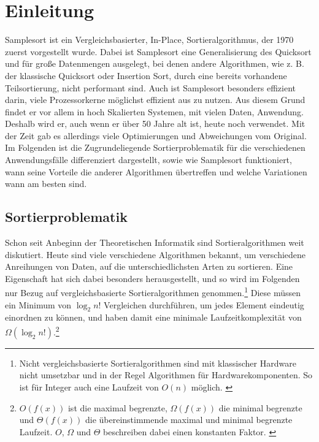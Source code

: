 \section{Einleitung}
	Samplesort ist ein Vergleichsbasierter, In-Place, Sortieralgorithmus, der 1970 zuerst vorgestellt wurde. \autocite{frazer-1970}
	Dabei ist Samplesort eine Generalisierung des Quicksort und für große Datenmengen ausgelegt, bei denen andere Algorithmen, wie z. B. der klassische Quicksort oder Insertion Sort, durch eine bereits vorhandene Teilsortierung, nicht performant sind.
	Auch ist Samplesort besonders effizient darin, viele Prozessorkerne möglichst effizient aus zu nutzen.
	Aus diesem Grund findet er vor allem in hoch Skalierten Systemen, mit vielen Daten, Anwendung.\\
	Deshalb wird er, auch wenn er über 50 Jahre alt ist, heute noch verwendet.
	Mit der Zeit gab es allerdings viele Optimierungen und Abweichungen vom Original.
	Im Folgenden ist die Zugrundeliegende Sortierproblematik für die verschiedenen Anwendungsfälle differenziert dargestellt, sowie wie Samplesort funktioniert, wann seine Vorteile die anderer Algorithmen übertreffen und welche Variationen wann am besten sind.
	
	\subsection{Sortierproblematik}
		Schon seit Anbeginn der Theoretischen Informatik sind Sortieralgorithmen weit diskutiert.
		Heute sind viele verschiedene Algorithmen bekannt, um verschiedene Anreihungen von Daten, auf die unterschiedlichsten Arten zu sortieren.
		Eine Eigenschaft hat sich dabei besonders herausgestellt, und so wird im Folgenden nur Bezug auf vergleichsbasierte Sortieralgorithmen genommen.\footnote{Nicht vergleichsbasierte Sortieralgorithmen sind mit klassischer Hardware nicht umsetzbar und in der Regel Algorithmen für Hardwarekomponenten. So ist für Integer auch eine Laufzeit von $O(n)$ möglich. \autocite{abdel-hafeez-2017}}
		Diese müssen ein Minimum von $\log_2{n!}$ Vergleichen durchführen, um jedes Element eindeutig einordnen zu können, und haben damit eine minimale Laufzeitkomplexität von $\Omega(\log_2{n!})$.\footnote{$O(f(x))$ ist die maximal begrenzte, $\Omega(f(x))$ die minimal begrenzte und $\Theta(f(x))$ die übereinstimmende maximal und minimal begrenzte Laufzeit. $O$, $\Omega$ und $\Theta$ beschreiben dabei einen konstanten Faktor. \autocite[4]{sedgewick-1996}}
	

